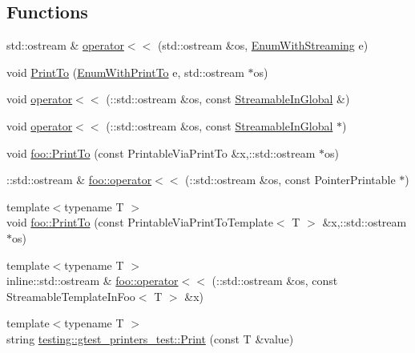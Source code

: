 \subsection*{Functions}
\begin{DoxyCompactItemize}
\item 
std\+::ostream \& \hyperlink{gtest-printers__test_8cc_ab3395b6b04bac565a0bd2fb36fbbb339}{operator$<$$<$} (std\+::ostream \&os, \hyperlink{gtest-printers__test_8cc_a52d9f846ca7a081ba3acf88dd6cd46dc}{Enum\+With\+Streaming} e)
\item 
void \hyperlink{gtest-printers__test_8cc_aad8245a4b48cd65607b86153d0f9dbe6}{Print\+To} (\hyperlink{gtest-printers__test_8cc_a904d619d593201ed509be794aed041ec}{Enum\+With\+Print\+To} e, std\+::ostream $\ast$os)
\item 
void \hyperlink{gtest-printers__test_8cc_a7b9d893679e433b9a70f15a9c9d6446c}{operator$<$$<$} (\+::std\+::ostream \&os, const \hyperlink{classStreamableInGlobal}{Streamable\+In\+Global} \&)
\item 
void \hyperlink{gtest-printers__test_8cc_a0794c66a458fe922bfb717080d047311}{operator$<$$<$} (\+::std\+::ostream \&os, const \hyperlink{classStreamableInGlobal}{Streamable\+In\+Global} $\ast$)
\item 
void \hyperlink{namespacefoo_a6808585dc0cb2884adeb4f39e3cb95cf}{foo\+::\+Print\+To} (const Printable\+Via\+Print\+To \&x,\+::std\+::ostream $\ast$os)
\item 
\+::std\+::ostream \& \hyperlink{namespacefoo_a65f8809f6af7f69f5cc842493caf4491}{foo\+::operator$<$$<$} (\+::std\+::ostream \&os, const Pointer\+Printable $\ast$)
\item 
{\footnotesize template$<$typename T $>$ }\\void \hyperlink{namespacefoo_a27945da9cb5c9d3d51b69e6429c2f46d}{foo\+::\+Print\+To} (const Printable\+Via\+Print\+To\+Template$<$ T $>$ \&x,\+::std\+::ostream $\ast$os)
\item 
{\footnotesize template$<$typename T $>$ }\\inline\+::std\+::ostream \& \hyperlink{namespacefoo_abe04f604d114085b0b9af25600ef00da}{foo\+::operator$<$$<$} (\+::std\+::ostream \&os, const Streamable\+Template\+In\+Foo$<$ T $>$ \&x)
\item 
{\footnotesize template$<$typename T $>$ }\\string \hyperlink{namespacetesting_1_1gtest__printers__test_adab26e59d2d7781c06a2c1c5948a8f65}{testing\+::gtest\+\_\+printers\+\_\+test\+::\+Print} (const T \&value)
\item 

\end{DoxyCompactItemize}
